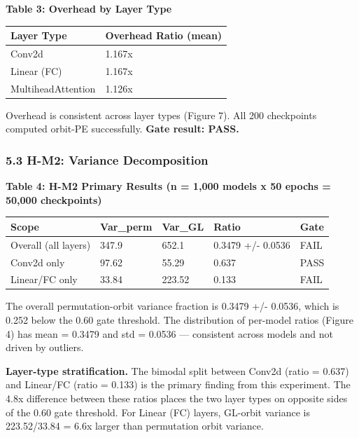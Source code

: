 \textbf{Table 3: Overhead by Layer Type}

\begin{table}[htbp]
\centering
\begin{tabular}{ll}
\toprule
Layer Type & Overhead Ratio (mean) \\
\midrule
Conv2d & 1.167x \\
Linear (FC) & 1.167x \\
MultiheadAttention & 1.126x \\
\bottomrule
\end{tabular}
\end{table}

Overhead is consistent across layer types (Figure 7). All 200 checkpoints computed orbit-PE successfully. \textbf{Gate result: PASS.}

\subsubsection{5.3 H-M2: Variance Decomposition}

\textbf{Table 4: H-M2 Primary Results (n = 1,000 models x 50 epochs = 50,000 checkpoints)}

\begin{table}[htbp]
\centering
\begin{tabular}{lllll}
\toprule
Scope & Var_perm & Var_GL & Ratio & Gate \\
\midrule
Overall (all layers) & 347.9 & 652.1 & 0.3479 +/- 0.0536 & FAIL \\
Conv2d only & 97.62 & 55.29 & 0.637 & PASS \\
Linear/FC only & 33.84 & 223.52 & 0.133 & FAIL \\
\bottomrule
\end{tabular}
\end{table}

The overall permutation-orbit variance fraction is 0.3479 +/- 0.0536, which is 0.252 below the 0.60 gate threshold. The distribution of per-model ratios (Figure 4) has mean = 0.3479 and std = 0.0536 — consistent across models and not driven by outliers.

\textbf{Layer-type stratification.} The bimodal split between Conv2d (ratio = 0.637) and Linear/FC (ratio = 0.133) is the primary finding from this experiment. The 4.8x difference between these ratios places the two layer types on opposite sides of the 0.60 gate threshold. For Linear (FC) layers, GL-orbit variance is 223.52/33.84 = 6.6x larger than permutation orbit variance.

